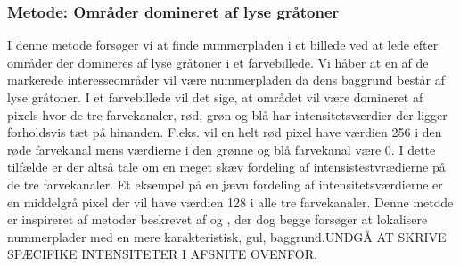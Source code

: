 \subsubsection{Metode: Områder domineret af lyse gråtoner}
\label{sec:DetectSameness}
I denne metode forsøger vi at finde nummerpladen i et billede ved at lede efter områder der domineres af lyse gråtoner i et farvebillede. Vi håber at en af de markerede interesseområder vil være nummerpladen da dens baggrund består af lyse gråtoner. I et farvebillede vil det sige, at området vil være domineret af pixels hvor de tre farvekanaler, rød, grøn og blå har intensitetsværdier der ligger forholdsvis tæt på hinanden. F.eks. vil en helt rød pixel have værdien 256 i den røde farvekanal mens værdierne i den grønne og blå farvekanal være 0. I dette tilfælde er der altså tale om en meget skæv fordeling af intensistestvrædierne på de tre farvekanaler. Et eksempel på en jævn fordeling af intensitetsværdierne er en middelgrå pixel der vil have værdien 128 i alle tre farvekanaler. Denne metode er inspireret af metoder beskrevet af \cite{ron} og \cite{nijhuis}, der dog begge forsøger at lokalisere nummerplader med en mere karakteristisk, gul, baggrund.UNDGÅ AT SKRIVE SPÆCIFIKE INTENSITETER I AFSNITE OVENFOR.

